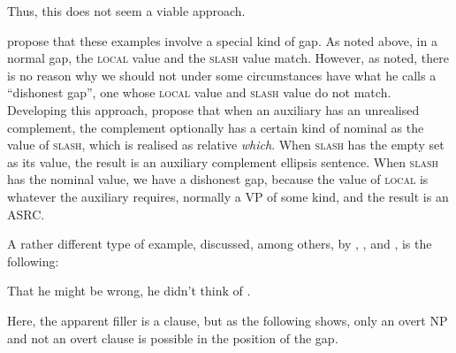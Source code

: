 \documentclass[output=paper
,notxmath 
	        ,collection
	        ,collectionchapter
 	        ,biblatex
                ,babelshorthands
                ,newtxmath
                ,draftmode
                ,colorlinks, citecolor=brown
]{langscibook}
\begin{document}
\begin{exe} \ex \begin{xlist} 

\end{xlist}
\end{exe}
\noindent
\begin{exe} \ex \begin{xlist} 

\end{xlist}
\end{exe}

\noindent
Thus, this does not seem a viable approach.

\citet{Arnold:Borsley:10} propose that these examples involve a special
kind of gap. As noted above, in a normal gap, the \textsc{local} value and the
\textsc{slash} value match. However, as \citet{webelhuth08} noted, there is no
reason why we should not under some circumstances have what he calls a
``dishonest gap'', one whose \textsc{local} value and \textsc{slash} value do not match.
Developing this approach, \citet{Arnold:Borsley:10} propose that when an
auxiliary has an unrealised complement, the complement optionally has a
certain kind of nominal as the value of \textsc{slash}, which is realised as
relative \emph{which}. When \textsc{slash} has the empty set as its value, the
result is an auxiliary complement ellipsis sentence. When \textsc{slash} has the
nominal value, we have a dishonest gap, because the value of \textsc{local} is
whatever the auxiliary requires, normally a VP of some kind, and the
result is an ASRC.

A rather different type of example, discussed, among others, by
\citet[Chapter~2]{Bresnan01}, \citet[25--26]{Bouma:Malouf:Sag:01}, and \citet{Webelhuth:12},
is the following:

\begin{exe}
\ex  \label{ex:UDC:ThatHeMightBeWrong}  That he might be wrong, he didn't think of \trace{}.
\end{exe}

\noindent
Here, the apparent filler is a clause, but as the following shows, only
an overt NP and not an overt clause is possible in the position of the
gap.

\begin{exe}
\ex
\begin{xlist}
\end{xlist}
\end{exe}
\end{document}
